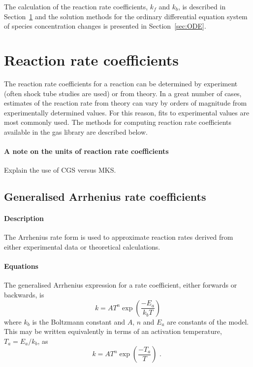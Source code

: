 The calculation of the reaction rate coefficients, $k_f$ and $k_b$, is described in
Section~\ref{sec:reac_coeffs} and the solution methods for the ordinary differential
equation system of species concentration changes is presented in Section~\ref{sec:ODE}.

\section{Reaction rate coefficients}
\label{sec:reac_coeffs}

The reaction rate coefficients for a reaction can be determined by experiment (often
shock tube studies are used) or from theory.
In a great number of cases, estimates of the reaction rate from theory can vary by
orders of magnitude from experimentally determined values.
For this reason, fits to experimental values are most commonly used.
The methods for computing reaction rate coefficients available in the
gas library are described below.

\paragraph{A note on the units of reaction rate coefficients}
Explain the use of CGS versus MKS.


\subsection{Generalised Arrhenius rate coefficients}
\paragraph{Description}
The Arrhenius rate form is used to approximate reaction
rates derived from either experimental data
or theoretical calculations.

\paragraph{Equations}

The generalised Arrhenius expression for a rate coefficient, either forwards or backwards, is
\begin{equation}
\label{eqn:ga}
k = A T^{n} \exp{\left( \frac{-E_a}{k_bT}\right)}
\end{equation}
where $k_b$ is the Boltzmann constant and $A$, $n$ and $E_a$ are constants
of the model.
This may be written equivalently in terms of an activation
temperature, $T_a = E_a/k_b$, as
\begin{equation}
k = A T^{n} \exp{\left( \frac{-T_a}{T}\right)} \text{ . }
\end{equation}


